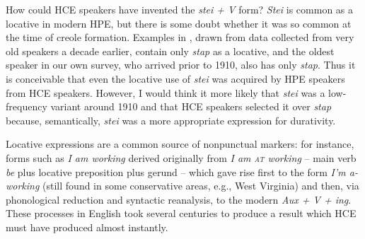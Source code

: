 How could HCE speakers have invented the \textit{stei + V} form? \textit{Stei} is common as a locative in modern HPE, but there is some doubt whether it was so common at the time of creole formation. Examples in \citet{Nagara1972}, drawn from data collected from very old speakers a decade earlier, contain only \textit{stap} as a locative, and the oldest speaker in our own survey, who arrived prior to 1910, also has only \textit{stap}. Thus it is conceivable that even the locative use of \textit{stei} was acquired by HPE speakers from HCE speakers. However, I would think it more likely that \textit{stei} was a low-frequency variant around 1910 and that HCE speakers selected it over \textit{stap} because, semantically, \textit{stei} was a more appropriate expression for durativity.

Locative expressions are a common source of nonpunctual markers: for instance, forms such as \textit{I am working} derived originally from \textit{I am \textsc{at} working} -- main verb \textit{be} plus locative preposition plus
gerund -- which gave rise first to the form \textit{I'm a-working} (still found in some conservative areas, e.g., West Virginia) and then, via phonological reduction and syntactic reanalysis, to the modern \textit{Aux + V + ing}. These processes in English took several centuries to produce a result which HCE must have produced almost instantly.

